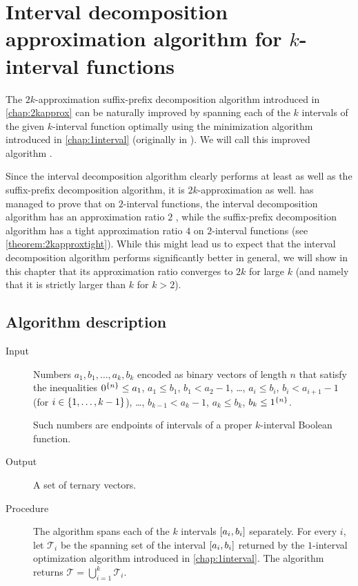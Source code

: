 \chapter{Interval decomposition approximation algorithm
for \texorpdfstring{$k$}{k}-interval functions}
\label{chap:betterapprox}

The $2k$-approximation
suffix-prefix decomposition algorithm
introduced in \autoref{chap:2kapprox}
can be naturally improved
by spanning each of the $k$ intervals
of the given $k$-interval function
optimally using the minimization algorithm
introduced in \autoref{chap:1interval}
(originally in \citet{Schieber2005154}).
We will call this improved algorithm
.

Since the interval decomposition algorithm
clearly performs at least as well
as the suffix-prefix decomposition algorithm,
it is $2k$-approximation as well.
\citeauthor{Dubovsky2012} has managed
to prove that on $2$-interval functions,
the interval decomposition algorithm
has an approximation ratio $2$
\citep[p.~39]{Dubovsky2012}, %
while the suffix-prefix decomposition algorithm
has a tight approximation ratio $4$
on $2$-interval functions
(see \autoref{theorem:2kapproxtight}).
While this might lead us to expect
that the interval decomposition algorithm
performs significantly better in general,
we will show in this chapter that its approximation ratio
converges to $2k$ for large $k$
(and namely that it is strictly larger than $k$
for $k > 2$).

\section{Algorithm description}

\begin{description}
\item[Input] Numbers $a_1, b_1, \ldots, a_k, b_k$
encoded as binary vectors of length $n$
that satisfy the inequalities
$0^{\{n\}} \leq a_1$,
$a_1 \leq b_1$,
$b_1 < a_2 - 1$,
\ldots,
$a_i \leq b_i$,
$b_i < a_{i+1} - 1$
(for $i \in \{1, \ldots, k-1\}$),
\ldots,
$b_{k-1} < a_k - 1$,
$a_k \leq b_k$,
$b_k \leq 1^{\{n\}}$.

Such numbers are endpoints of intervals
of a proper $k$-interval Boolean function.

\item[Output] A set of ternary vectors.

\item[Procedure]
The algorithm spans each of the $k$ intervals
$[a_i, b_i]$ separately.
For every $i$,
let $\mathcal{T}_i$ be the spanning set of the interval
$[a_i, b_i]$ returned by the $1$-interval
optimization algorithm
introduced in \autoref{chap:1interval}.
The algorithm returns
$\mathcal{T} = \bigcup_{i=1}^k{\mathcal{T}_i}$.
\end{description}

